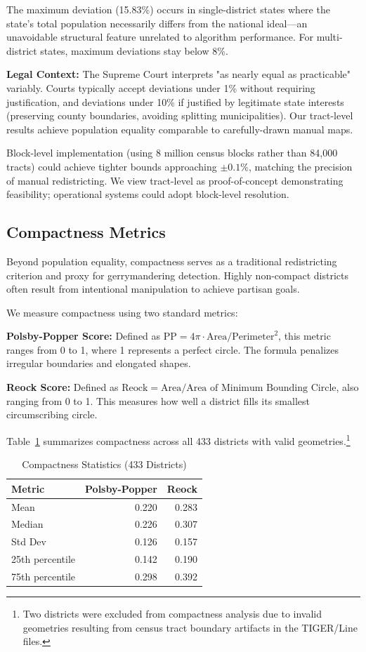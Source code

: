 The maximum deviation (15.83\%) occurs in single-district states where the state's total population necessarily differs from the national ideal—an unavoidable structural feature unrelated to algorithm performance. For multi-district states, maximum deviations stay below 8\%.

\textbf{Legal Context:} The Supreme Court interprets "as nearly equal as practicable" variably. Courts typically accept deviations under 1\% without requiring justification, and deviations under 10\% if justified by legitimate state interests (preserving county boundaries, avoiding splitting municipalities). Our tract-level results achieve population equality comparable to carefully-drawn manual maps.

Block-level implementation (using 8 million census blocks rather than 84,000 tracts) could achieve tighter bounds approaching $\pm 0.1\%$, matching the precision of manual redistricting. We view tract-level as proof-of-concept demonstrating feasibility; operational systems could adopt block-level resolution.

\subsection{Compactness Metrics}

Beyond population equality, compactness serves as a traditional redistricting criterion and proxy for gerrymandering detection. Highly non-compact districts often result from intentional manipulation to achieve partisan goals.

We measure compactness using two standard metrics:

\textbf{Polsby-Popper Score:} Defined as $\text{PP} = 4\pi \cdot \text{Area} / \text{Perimeter}^2$, this metric ranges from 0 to 1, where 1 represents a perfect circle. The formula penalizes irregular boundaries and elongated shapes.

\textbf{Reock Score:} Defined as $\text{Reock} = \text{Area} / \text{Area of Minimum Bounding Circle}$, also ranging from 0 to 1. This measures how well a district fills its smallest circumscribing circle.

Table~\ref{tab:compactness_stats} summarizes compactness across all 433 districts with valid geometries.\footnote{Two districts were excluded from compactness analysis due to invalid geometries resulting from census tract boundary artifacts in the TIGER/Line files.}

\begin{table}[h]
\centering
\caption{Compactness Statistics (433 Districts)}
\label{tab:compactness_stats}
\begin{tabular}{lrr}
\toprule
\textbf{Metric} & \textbf{Polsby-Popper} & \textbf{Reock} \\
\midrule
Mean & 0.220 & 0.283 \\
Median & 0.226 & 0.307 \\
Std Dev & 0.126 & 0.157 \\
25th percentile & 0.142 & 0.190 \\
75th percentile & 0.298 & 0.392 \\
\bottomrule
\end{tabular}
\end{table}

